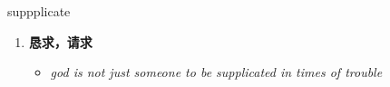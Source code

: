 
\begin{frame}
{\huge suppplicate}
\begin{center}
\begin{enumerate}\Large
  \item \textbf{恳求，请求}
  \begin{itemize}
    \item \em{\Large{god is not just someone to be supplicated in times of trouble}}
  \end{itemize}
\end{enumerate}
\end{center}
\end{frame}
